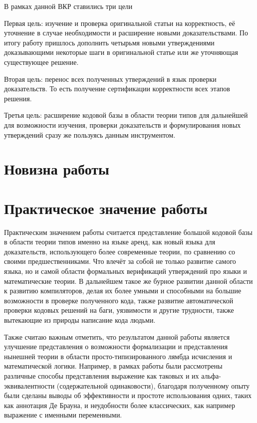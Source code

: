 \documentclass[times,specification,annotation]{itmo-student-thesis}
\begin{document}
В рамках данной ВКР ставились три цели

Первая цель: изучение и проверка оригинальной статьи на корректность, её уточнение в случае необходимости и расширение новыми доказательствами. По итогу работу пришлось дополнить четырьмя новыми утверждениями доказывающими некоторые шаги в оригинальной статье или же уточняющая существующее решение.

Вторая цель: перенос всех полученных утверждений в язык проверки доказательств. То есть получение сертификации корректности всех этапов решения.

Третья цель:  расширение кодовой базы в области теории типов для дальнейшей для возможности изучения, проверки доказательств и формулирования новых утверждений сразу же пользуясь данным инструментом.

\section{Новизна работы}
\todo
\section{Практическое значение работы}
\todo

Практическим значением работы считается представление большой кодовой базы в области теории типов именно на языке аренд, как новый языка для доказательств, использующего более современные теории, по сравнению со своими предшественниками.  Что влечёт за собой не только развитие самого языка,  но и самой области формальных верификаций утверждений про языки и математические теории. В дальнейшем такое же бурное развитии данной области к развитию компиляторов, делая их более умными и способными на большие возможности в проверке полученного кода, также развитие автоматической проверки кодовых решений на баги, уязвимости и другие трудности, также вытекающие из природы написание кода людьми.

Также считаю важным отметить, что результатом данной работы является улучшение представления о возможности формализации и представления нынешней теории в области просто-типизированного лямбда исчисления и математической логики. Например, в рамках работы были рассмотрены различные способы представления выражение как таковых и их альфа-эквивалентности (содержательной одинаковости), благодаря полученному опыту были сделаны выводы об эффективности и простоте использования одних, таких как аннотация Де Брауна, и неудобности более классических, как например выражение с именными переменными.
\end{document}
